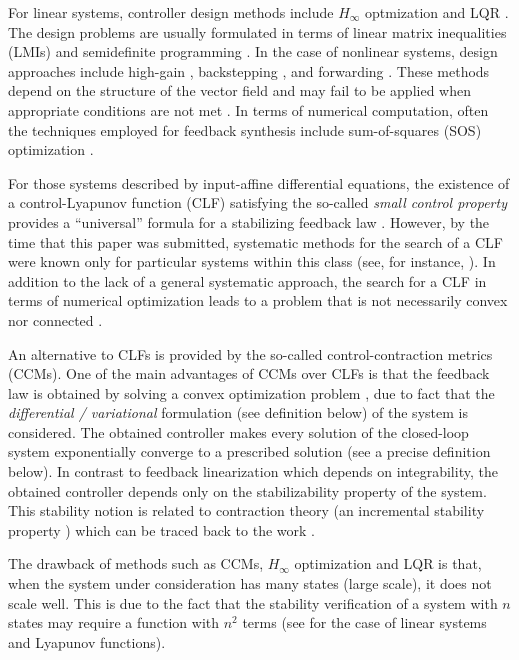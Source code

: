 \documentclass[10pt,twocolumn,twoside]{IEEEtran}
\theoremstyle{plain}
\theoremstyle{definition}
\theoremstyle{remark}
\begin{document}
For linear systems, controller design methods include $H_\infty$ optmization \cite{Doyleetal1992} and LQR \cite{Hespanha:2009}. The design problems are usually formulated in terms of linear matrix inequalities (LMIs) and semidefinite programming \cite{Boyd1994,DullerudPaganini2000}. In the case of nonlinear systems, design approaches include high-gain  \cite{GrognardSepulchreBastin1999}, backstepping \cite{Krstic1995}, and forwarding \cite{MazencPraly96}. These methods depend on the structure of the vector field and may fail to be applied when appropriate conditions are not met \cite{SteinShiromoto2013a}. In terms of numerical computation, often the techniques employed for feedback synthesis include sum-of-squares (SOS) optimization \cite{Parrilo2003}.

For those systems described by input-affine differential equations,  the existence of a control-Lyapunov function (CLF) satisfying the so-called \emph{small control property} provides a ``universal'' formula for a stabilizing feedback law  \cite{Sontag1983,Sontag1989a}. However, by the time that this paper was submitted, systematic methods for the search of a CLF were known only for particular systems within this class (see, for instance, \cite{MazencMalisoff2006}). In addition to the lack of a general systematic approach, the search for a CLF in terms of numerical optimization leads to a problem that is not necessarily convex nor connected \cite{Rantzer:2001}.

An alternative to CLFs is provided by the so-called control-contraction metrics (CCMs). One of the main advantages of CCMs over CLFs is that the feedback law is obtained by solving a convex optimization problem \cite{Manchester2014a}, due to fact that the \emph{differential / variational} formulation (see definition below) of the system is considered. The obtained controller makes every solution of the closed-loop system exponentially converge to a prescribed solution (see a precise definition below). In contrast to feedback linearization which depends on integrability, the obtained controller depends only on the stabilizability property of the system. This stability notion is related to contraction theory (an incremental stability property \cite{Angeli2002,Lohmiller1998,Rueffer2013,Sontag2010,Forni2014}) which can be traced back to the work \cite{Lewis1949}.

The drawback of methods such as CCMs, $H_\infty$ optimization and LQR is that, when the system under consideration has many states (large scale), it does not scale well. This is due to the fact that the stability verification of a system with $n$ states may require a function with $n^2$ terms (see \cite{Rantzer2015} for the case of linear systems and Lyapunov functions).
\end{document}
